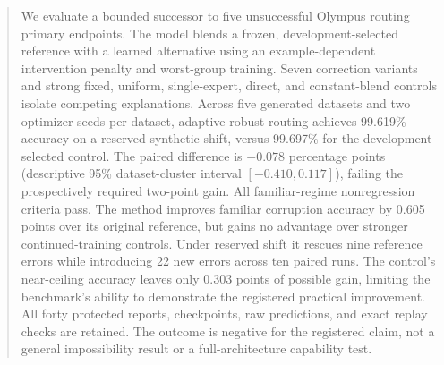 \begin{abstract}
We evaluate a bounded successor to five unsuccessful Olympus routing primary
endpoints. The model blends a frozen, development-selected reference with a
learned alternative using an example-dependent intervention penalty and
worst-group training. Seven correction variants and strong fixed, uniform,
single-expert, direct, and constant-blend controls isolate competing explanations.
Across five generated datasets and two optimizer seeds per dataset, adaptive
robust routing achieves 99.619\% accuracy on a reserved synthetic shift,
versus 99.697\% for the development-selected control. The paired difference is
$-0.078$ percentage points (descriptive 95\% dataset-cluster interval
$[-0.410,0.117]$), failing the prospectively required two-point gain.
All familiar-regime nonregression criteria pass. The method improves familiar
corruption accuracy by 0.605 points over its original reference, but gains no
advantage over stronger continued-training controls. Under reserved shift it
rescues nine reference errors while introducing 22 new errors across ten paired
runs. The control's near-ceiling accuracy leaves only 0.303 points of possible
gain, limiting the benchmark's ability to demonstrate the registered practical
improvement. All forty protected reports, checkpoints, raw predictions, and
exact replay checks are retained. The outcome is negative for the registered
claim, not a general impossibility result or a full-architecture capability test.
\end{abstract}
